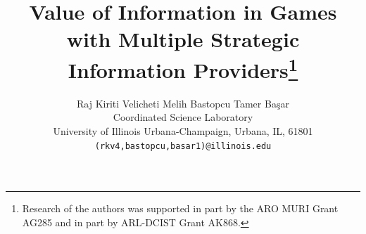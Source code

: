 \documentclass[12pt,journal,onecolumn]{IEEEtran}
\begin{document}
\title{Value of Information in Games with Multiple Strategic Information Providers\thanks{Research of the authors was supported in part by the ARO MURI Grant AG285 and in part by ARL-DCIST Grant AK868.}}
\author{Raj Kiriti Velicheti \qquad  Melih Bastopcu \qquad  Tamer Ba{\c s}ar\\
\normalsize Coordinated Science Laboratory\\
	\normalsize University of Illinois Urbana-Champaign, Urbana, IL, 61801\\
	\normalsize  \texttt{{\small (rkv4,bastopcu,basar1)@illinois.edu}}}

\maketitle
\end{document}
